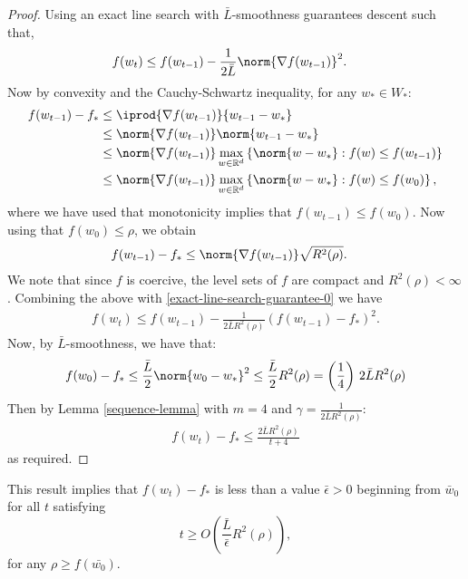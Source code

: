 \documentclass[10pt]{article} %
\begin{document}
\begin{proof}

    Using an exact line search with $\bar{L}$-smoothness guarantees descent such that,
    \begin{align}
        \label{exact-line-search-guarantee-0}
        f(w_{t}) 
        &\leq f(w_{t-1}) - \frac{1}{2\bar{L}}\norm{\nabla f(w_{t-1})}^2.
    \end{align}
    Now by convexity and the Cauchy-Schwartz inequality, for any $w_{*} \in W_{*}$:
    \begin{align*}
        f(w_{t-1}) - f_{*} &\leq \iprod{\nabla f(w_{t-1})}{w_{t-1} - w_{*}} \\
        &\leq \norm{\nabla f(w_{t-1})}\norm{w_{t-1} - w_{*}} \\
        & \leq \norm{\nabla f(w_{t-1})}\max_{w \in \mathbb{R}^d}\left\{\norm{w - w_*} : f(w) \leq f(w_{t-1})\right\}\\
        & \leq \norm{\nabla f(w_{t-1})}\max_{w \in \mathbb{R}^d}\left\{\norm{w - w_*} : f(w) \leq f(w_0)\right\},
    \end{align*} 
    where we have used that monotonicity implies that $f(w_{t-1})\leq f(w_0)$.
    Now using that $f(w_0) \leq \rho$, we obtain
    \begin{align*}
        f(w_{t-1}) - f_{*} &\leq \norm{\nabla f(w_{t-1})}\sqrt{R^2(\rho)}.
    \end{align*}
    We note that since $f$ is coercive, the level sets of $f$ are compact and $R^2(\rho) < \infty$.
    Combining the above with \eqref{exact-line-search-guarantee-0} we have
    \begin{align*}
        f(w_{t}) \leq f(w_{t-1}) - \frac{1}{2\bar{L}R^2(\rho)}(f(w_{t-1}) - f_{*})^2.
    \end{align*}
    Now, by $\bar{L}$-smoothness, we have that:
    \begin{align*}
        f(w_{0}) - f_{*} \leq \frac{\bar{L}}{2}\norm{w_{0} - w_{*}}^2 \leq \frac{\bar{L}}{2}R^2(\rho) = \left(\frac{1}{4}\right) \, 2\bar{L}R^2(\rho)
    \end{align*}
    Then by Lemma \ref{sequence-lemma} with $m = 4$ and $\gamma = \frac{1}{2\bar{L}R^2(\rho)}$:
    \begin{align*}
        f(w_{t}) - f_{*} \leq \frac{2\bar{L}R^2(\rho)}{t + 4}
    \end{align*}    
    as required.
\end{proof}
This result implies that $f(w_t) - f_*$ is less than a value $\bar{\epsilon} > 0$ beginning from $\bar{w}_0$ for all $t$ satisfying
\begin{equation}
\label{eq:GDic-convex}
t \geq O\left(\frac{\bar{L}}{\bar{\epsilon}}R^2(\rho)\right),
\end{equation}
for any $\rho \geq  f(\bar{w_0})$.
\end{document}
